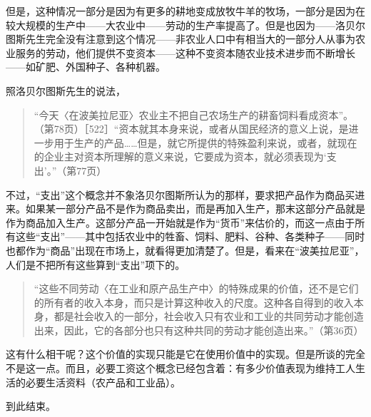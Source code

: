 但是，这种情况一部分是因为有更多的耕地变成放牧牛羊的牧场，一部分是因为在较大规模的生产中——大农业中——劳动的生产率提高了。但是也因为——洛贝尔图斯先生完全没有注意到这个情况——非农业人口中有相当大的一部分人从事为农业服务的劳动，他们提供不变资本——这种不变资本随农业技术进步而不断增长——如矿肥、外国种子、各种机器。

照洛贝尔图斯先生的说法，

\begin{quote}{“今天〈在波美拉尼亚〉农业主不把自己农场生产的耕畜饲料看成资本”。（第78页）［522］“资本就其本身来说，或者从国民经济的意义上说，是进一步用于生产的产品……但是，就它所提供的特殊盈利来说，或者，就现在的企业主对资本所理解的意义来说，它要成为资本，就必须表现为‘支出’。”（第77页）}\end{quote}

不过，“支出”这个概念并不象洛贝尔图斯所认为的那样，要求把产品作为商品买进来。如果某一部分产品不是作为商品卖出，而是再加入生产，那末这部分产品就是作为商品加入生产。这部分产品一开始就是作为“货币”来估价的，而这一点由于所有这些“支出”——其中包括农业中的牲畜、饲料、肥料、谷种、各类种子——同时也都作为“商品”出现在市场上，就看得更加清楚了。但是，看来在“波美拉尼亚”，人们是不把所有这些算到“支出”项下的。

\begin{quote}{“这些不同劳动〈在工业和原产品生产中〉的特殊成果的价值，还不是它们的所有者的收入本身，而只是计算这种收入的尺度。这种各自得到的收入本身，都是社会收入的一部分，社会收入只有农业和工业的共同劳动才能创造出来，因此，它的各部分也只有这种共同的劳动才能创造出来。”（第36页）}\end{quote}

这有什么相干呢？这个价值的实现只能是它在使用价值中的实现。但是所谈的完全不是这一点。而且，必要工资这个概念已经包含着：有多少价值表现为维持工人生活的必要生活资料（农产品和工业品）。

到此结束。





